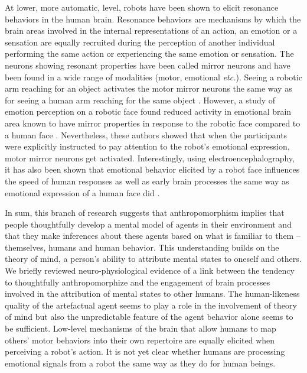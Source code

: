 \documentclass{frontiersSCNS} %
\newcommand{\etc}{\textit{etc.}\xspace}
\begin{document}
At lower, more automatic, level, robots have been shown to elicit resonance
behaviors in the human brain. Resonance behaviors \citep{Rizzolatti1999} are
mechanisms by which the brain areas involved in the internal representations of
an action, an emotion or a sensation are equally recruited during the perception
of another individual performing the same action or experiencing the same
emotion or sensation.  The neurons showing resonant properties have been called
mirror neurons and have been found in a wide range of modalities (motor,
emotional \etc). Seeing a robotic arm reaching for an object
activates the motor mirror neurons the same way as for seeing a human arm
reaching for the same object \citep{Gazzola2007, oberman_eeg_2007}. However, a
study of emotion perception on a robotic face found reduced activity in
emotional brain area known to have mirror properties in response to the robotic
face compared to a human face \citep{Chaminade2010}. Nevertheless, these authors
showed that when the participants were explicitly instructed to pay attention to
the robot's emotional expression, motor mirror neurons get activated.
Interestingly, using electroencephalography,  it has also been shown that
emotional behavior elicited by a robot face influences the speed of human
responses as well as early brain processes the same way as emotional expression
of a human face did \citep{Dubal2010}.


%


In sum, this branch of research suggests that anthropomorphism implies that
people thoughtfully develop a mental model of agents in their environment and
that they make inferences about these agents based on what is familiar to them
-- themselves, humans and human behavior. This understanding builds on the
theory of mind,  a
person's ability to attribute mental states to oneself and others. 
We briefly reviewed  neuro-physiological evidence of a link between the tendency
to thoughtfully anthropomorphize and the engagement of brain processes involved
in the attribution of mental states to other humans. The human-likeness quality
of the artefactual agent seems to play a role in the involvement of theory of
mind but also the unpredictable feature of the agent behavior alone seems to be
sufficient. Low-level mechanisms of the brain that allow humans to map others'
motor behaviors into their own repertoire are equally elicited when perceiving a
robot's action. It is not yet clear whether humans are processing emotional
signals from a robot the same way as they do for human beings. 
\end{document}
